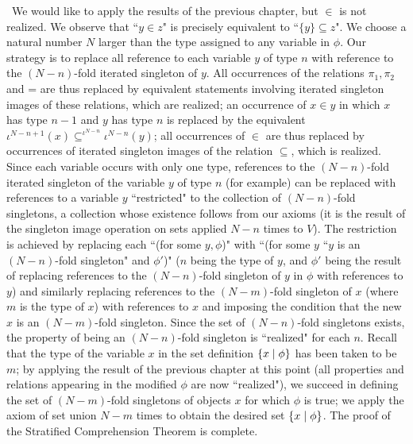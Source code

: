 \preuve\ We would like to apply the results of the previous
chapter, but $\in$ is not realized.  We observe that ``$y \in z$" is
precisely equivalent to ``$\{y\} \subseteq z$".  We choose a natural
number $N$ larger than the type assigned to any variable in $\phi$.  Our
strategy is to replace all reference to each variable $y$ of type $n$
with reference to the $(N - n)$-fold iterated
singleton of $y$.  All 
occurrences of the relations $\pi_1, \pi_2$ and = are thus replaced by
equivalent statements involving iterated singleton images of
these relations, which are 
realized; an occurrence of $x \in y$ in which $x$ has type $n-1$ and $y$ has type $n$
is replaced by the equivalent $\iota^{N-n+1}(x) \subseteq^{\iota^{N-n}} \iota^{N-n}(y)$;
all occurrences of $\in$ are thus replaced by occurrences of
iterated singleton images of the relation $\subseteq$, which is realized.  Since each variable occurs with only one type, references 
to the $(N-n)$-fold iterated singleton of the
variable $y$ of type $n$ 
(for example) can be replaced with references to a variable $y$
``restricted" to the collection of $(N-n)$-fold singletons, a
collection whose existence follows from our axioms (it is the result
of the singleton image operation on sets applied $N - n$
times to $V$).  The restriction is achieved by replacing each ``(for some $y,
\phi$)" with ``(for some $y$ ``$y$ is an $(N - n)$-fold singleton" and
$\phi'$)" ($n$ being the type of $y$, and $\phi'$ being
the result of replacing references to the $(N - n)$-fold
singleton of $y$ in $\phi$
with references to $y$) and similarly replacing references to the
$(N-m)$-fold singleton of $x$ (where $m$ is the type of $x$) with
references to $x$ and imposing the condition that the new $x$ is an
$(N-m)$-fold singleton. Since the set of $(N-n)$-fold singletons
exists, the property of being an $(N - n)$-fold singleton is
``realized" for each $n$.  Recall that the type of the variable $x$ in the set
definition $\{x \mid \phi\}$ has been taken to be $m$; by applying the
result of the previous chapter at this point (all properties
and relations appearing in the modified $\phi$ are
now ``realized"), we succeed in defining the set of $(N - m)$-fold
singletons of objects $x$ for which $\phi$ is true;
we apply the axiom of set union $N-m$ times to obtain the
desired set $\{x \mid \phi\}$.  The proof of the Stratified Comprehension
Theorem  is complete.
\finpreuve

